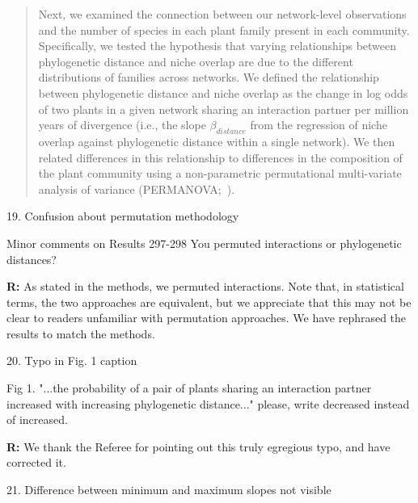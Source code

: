 \documentclass[12pt]{letter}
\newenvironment{refquote}{\bigskip \begin{it}}{\end{it}\smallskip}
\begin{document}
		\begin{quotation}
			Next, we examined the connection between our network-level observations
			and the number of species in each plant family present in each community.
			Specifically, we tested the hypothesis that
			varying relationships between phylogenetic distance and
			niche overlap are due to the different distributions 
			of families across networks. We defined the relationship between
			phylogenetic distance and niche overlap as the change in 
			log odds of two plants in a given network sharing an interaction 
			partner per million years of divergence (i.e., the slope $\beta_{distance}$ from the 
			regression of niche overlap against phylogenetic distance within
			a single network). We then related differences in this relationship
			to differences in the composition of the plant community 
			using a non-parametric permutational multi-variate 
			analysis of variance (PERMANOVA;~\citealp{Anderson2001}).
	    \end{quotation}



	19. Confusion about permutation methodology 

		\begin{refquote}
			Minor comments on Results
			297-298 You permuted interactions or phylogenetic distances?
		\end{refquote}


		\textbf{R:} As stated in the methods, we permuted interactions. Note that, in statistical terms, the two approaches are equivalent, but we appreciate that this may not be clear to readers unfamiliar with permutation approaches. We have rephrased the results to match the methods.


	20. Typo in Fig. 1 caption 

		\begin{refquote}
			Fig 1. "...the probability of a pair of plants sharing an interaction partner increased with increasing phylogenetic distance..." please, write decreased instead of increased.
		\end{refquote}


		\textbf{R:} We thank the Referee for pointing out this truly egregious typo, and have corrected it.


	21. Difference between minimum and maximum slopes not visible 
\end{document}
